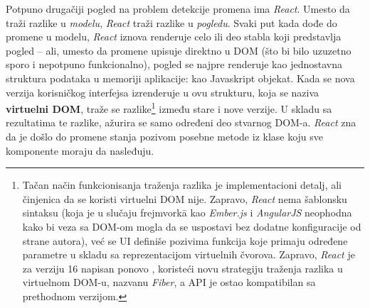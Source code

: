 Potpuno drugačiji pogled na problem detekcije promena ima \textsl{React}.
Umesto da traži razlike u \emph{modelu}, \textsl{React} traži razlike u \emph{pogledu}.
Svaki put kada dođe do promene u modelu, \textsl{React} iznova renderuje celo ili deo stabla koji predstavlja pogled -- ali, umesto da promene upisuje direktno u DOM (što bi bilo uzuzetno sporo i nepotpuno funkcionalno), pogled se najpre renderuje kao jednostavna struktura podataka u memoriji aplikacije: kao Javaskript objekat.
Kada se nova verzija korisničkog interfejsa izrenderuje u ovu strukturu, koja se naziva \textbf{virtuelni DOM}, traže se razlike\footnote{Tačan način funkcionisanja traženja razlika je implementacioni detalj, ali činjenica da se koristi virtuelni DOM nije. Zapravo, \textsl{React} nema šablonsku sintaksu (koja je u slučaju frejmvork\=a kao \textsl{Ember.js} i \textsl{AngularJS} neophodna kako bi veza sa DOM-om mogla da se uspostavi bez dodatne konfiguracije od strane autora), već se UI definiše pozivima funkcija koje primaju određene parametre u skladu sa reprezentacijom virtuelnih čvorova. Zapravo, \textsl{React} je za verziju 16 napisan ponovo \cite{what-is-react-fiber}, koristeći novu strategiju traženja razlika u virtuelnom DOM-u, nazvanu \textit{Fiber}, a API je ostao kompatibilan sa prethodnom verzijom.} između stare i nove verzije.
U skladu sa rezultatima te razlike, ažurira se samo određeni deo stvarnog DOM-a.
\textsl{React} zna da je došlo do promene stanja pozivom posebne metode iz klase koju sve komponente moraju da nasleđuju.
 